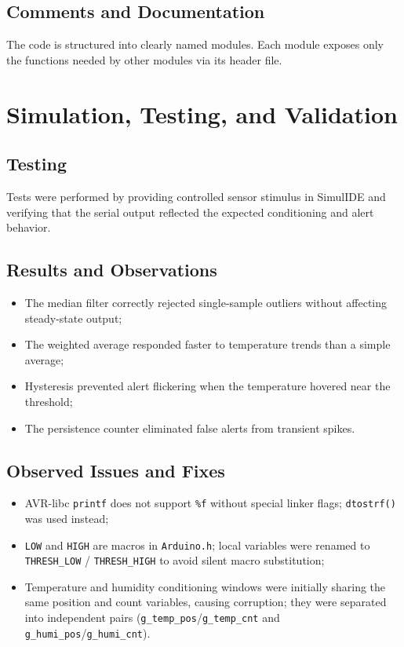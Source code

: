 \documentclass[12pt,a4paper]{article}
\begin{document}
\subsection{Comments and Documentation}
The code is structured into clearly named modules. Each module exposes only
the functions needed by other modules via its header file.

\section{Simulation, Testing, and Validation}

\subsection{Testing}
Tests were performed by providing controlled sensor stimulus in SimulIDE and
verifying that the serial output reflected the expected conditioning and alert behavior.

\subsection{Results and Observations}
\begin{itemize}
    \item The median filter correctly rejected single-sample outliers without affecting steady-state output;
    \item The weighted average responded faster to temperature trends than a simple average;
    \item Hysteresis prevented alert flickering when the temperature hovered near the threshold;
    \item The persistence counter eliminated false alerts from transient spikes.
\end{itemize}

\subsection{Observed Issues and Fixes}
\begin{itemize}
    \item AVR-libc \texttt{printf} does not support \texttt{\%f} without special linker flags;
          \texttt{dtostrf()} was used instead;
    \item \texttt{LOW} and \texttt{HIGH} are macros in \texttt{Arduino.h}; local variables
          were renamed to \texttt{THRESH\_LOW} / \texttt{THRESH\_HIGH} to avoid silent
          macro substitution;
    \item Temperature and humidity conditioning windows were initially sharing the same
          position and count variables, causing corruption; they were separated into
          independent pairs (\texttt{g\_temp\_pos}/\texttt{g\_temp\_cnt} and
          \texttt{g\_humi\_pos}/\texttt{g\_humi\_cnt}).
\end{itemize}
\end{document}
